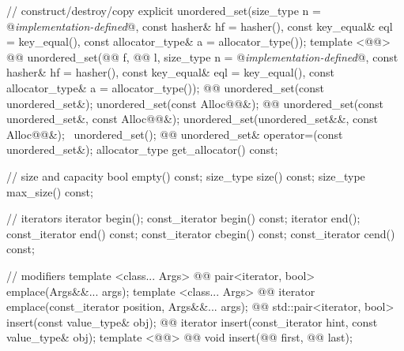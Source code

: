 \documentclass[american,twoside]{book}
\begin{document}
\begin{codeblock}
{{    // construct/destroy/copy
    explicit unordered_set(size_type n = @\textit{implementation-defined}@,
                           const hasher& hf = hasher(),
                           const key_equal& eql = key_equal(),
                           const allocator_type& a = allocator_type());
    template <@@>
      @@
      unordered_set(@@ f, @@ l,
                    size_type n = @\textit{implementation-defined}@,
                    const hasher& hf = hasher(),
                    const key_equal& eql = key_equal(),
                    const allocator_type& a = allocator_type());
    @@ 
      unordered_set(const unordered_set&);
    unordered_set(const Alloc@@&);
    @@ 
      unordered_set(const unordered_set&, const Alloc@@&);
    unordered_set(unordered_set&&, const Alloc@@&);
    ~unordered_set();
    @@
      unordered_set& operator=(const unordered_set&);
    allocator_type get_allocator() const;

    // size and capacity
    bool empty() const;
    size_type size() const;
    size_type max_size() const;

    // iterators
    iterator       begin();
    const_iterator begin() const;
    iterator       end();
    const_iterator end() const;
    const_iterator cbegin() const;
    const_iterator cend() const;

    // modifiers
    template <class... Args> 
      @@
      pair<iterator, bool> emplace(Args&&... args);
    template <class... Args> 
      @@
      iterator emplace(const_iterator position, Args&&... args);
    @@ 
      std::pair<iterator, bool> insert(const value_type& obj);
    @@ 
      iterator insert(const_iterator hint, const value_type& obj);
    template <@@> 
      @@
      void insert(@@ first, @@ last);

}}
\end{codeblock}
\end{document}
